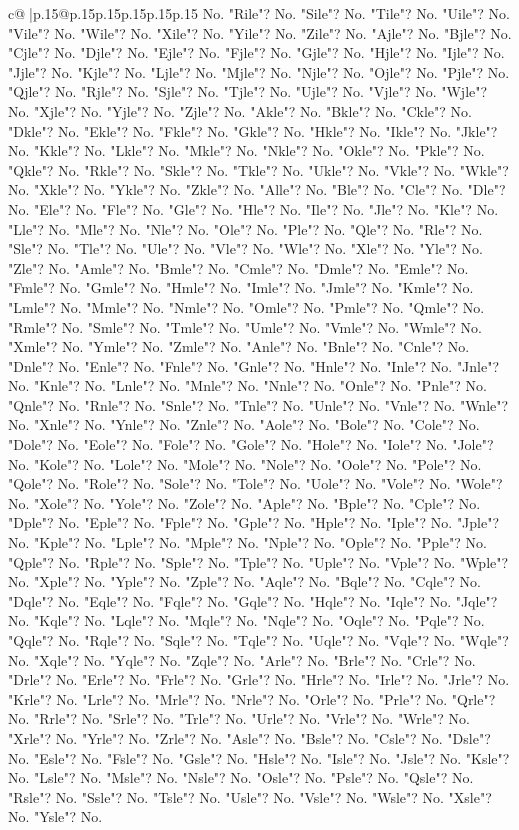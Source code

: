 \documentclass{article}
\begin{document}
{\begin{supertabular}{c@{$\;$}|p{.15\linewidth}@{}p{.15\linewidth}p{.15\linewidth}p{.15\linewidth}p{.15\linewidth}p{.15\linewidth}}
{{{No. "Rile"? No. "Sile"? No. "Tile"? No. "Uile"? No. "Vile"? No. "Wile"? No. "Xile"? No. "Yile"? No. "Zile"? No. "Ajle"? No. "Bjle"? No. "Cjle"? No. "Djle"? No. "Ejle"? No. "Fjle"? No. "Gjle"? No. "Hjle"? No. "Ijle"? No. "Jjle"? No. "Kjle"? No. "Ljle"? No. "Mjle"? No. "Njle"? No. "Ojle"? No. "Pjle"? No. "Qjle"? No. "Rjle"? No. "Sjle"? No. "Tjle"? No. "Ujle"? No. "Vjle"? No. "Wjle"? No. "Xjle"? No. "Yjle"? No. "Zjle"? No. "Akle"? No. "Bkle"? No. "Ckle"? No. "Dkle"? No. "Ekle"? No. "Fkle"? No. "Gkle"? No. "Hkle"? No. "Ikle"? No. "Jkle"? No. "Kkle"? No. "Lkle"? No. "Mkle"? No. "Nkle"? No. "Okle"? No. "Pkle"? No. "Qkle"? No. "Rkle"? No. "Skle"? No. "Tkle"? No. "Ukle"? No. "Vkle"? No. "Wkle"? No. "Xkle"? No. "Ykle"? No. "Zkle"? No. "Alle"? No. "Ble"? No. "Cle"? No. "Dle"? No. "Ele"? No. "Fle"? No. "Gle"? No. "Hle"? No. "Ile"? No. "Jle"? No. "Kle"? No. "Lle"? No. "Mle"? No. "Nle"? No. "Ole"? No. "Ple"? No. "Qle"? No. "Rle"? No. "Sle"? No. "Tle"? No. "Ule"? No. "Vle"? No. "Wle"? No. "Xle"? No. "Yle"? No. "Zle"? No. "Amle"? No. "Bmle"? No. "Cmle"? No. "Dmle"? No. "Emle"? No. "Fmle"? No. "Gmle"? No. "Hmle"? No. "Imle"? No. "Jmle"? No. "Kmle"? No. "Lmle"? No. "Mmle"? No. "Nmle"? No. "Omle"? No. "Pmle"? No. "Qmle"? No. "Rmle"? No. "Smle"? No. "Tmle"? No. "Umle"? No. "Vmle"? No. "Wmle"? No. "Xmle"? No. "Ymle"? No. "Zmle"? No. "Anle"? No. "Bnle"? No. "Cnle"? No. "Dnle"? No. "Enle"? No. "Fnle"? No. "Gnle"? No. "Hnle"? No. "Inle"? No. "Jnle"? No. "Knle"? No. "Lnle"? No. "Mnle"? No. "Nnle"? No. "Onle"? No. "Pnle"? No. "Qnle"? No. "Rnle"? No. "Snle"? No. "Tnle"? No. "Unle"? No. "Vnle"? No. "Wnle"? No. "Xnle"? No. "Ynle"? No. "Znle"? No. "Aole"? No. "Bole"? No. "Cole"? No. "Dole"? No. "Eole"? No. "Fole"? No. "Gole"? No. "Hole"? No. "Iole"? No. "Jole"? No. "Kole"? No. "Lole"? No. "Mole"? No. "Nole"? No. "Oole"? No. "Pole"? No. "Qole"? No. "Role"? No. "Sole"? No. "Tole"? No. "Uole"? No. "Vole"? No. "Wole"? No. "Xole"? No. "Yole"? No. "Zole"? No. "Aple"? No. "Bple"? No. "Cple"? No. "Dple"? No. "Eple"? No. "Fple"? No. "Gple"? No. "Hple"? No. "Iple"? No. "Jple"? No. "Kple"? No. "Lple"? No. "Mple"? No. "Nple"? No. "Ople"? No. "Pple"? No. "Qple"? No. "Rple"? No. "Sple"? No. "Tple"? No. "Uple"? No. "Vple"? No. "Wple"? No. "Xple"? No. "Yple"? No. "Zple"? No. "Aqle"? No. "Bqle"? No. "Cqle"? No. "Dqle"? No. "Eqle"? No. "Fqle"? No. "Gqle"? No. "Hqle"? No. "Iqle"? No. "Jqle"? No. "Kqle"? No. "Lqle"? No. "Mqle"? No. "Nqle"? No. "Oqle"? No. "Pqle"? No. "Qqle"? No. "Rqle"? No. "Sqle"? No. "Tqle"? No. "Uqle"? No. "Vqle"? No. "Wqle"? No. "Xqle"? No. "Yqle"? No. "Zqle"? No. "Arle"? No. "Brle"? No. "Crle"? No. "Drle"? No. "Erle"? No. "Frle"? No. "Grle"? No. "Hrle"? No. "Irle"? No. "Jrle"? No. "Krle"? No. "Lrle"? No. "Mrle"? No. "Nrle"? No. "Orle"? No. "Prle"? No. "Qrle"? No. "Rrle"? No. "Srle"? No. "Trle"? No. "Urle"? No. "Vrle"? No. "Wrle"? No. "Xrle"? No. "Yrle"? No. "Zrle"? No. "Asle"? No. "Bsle"? No. "Csle"? No. "Dsle"? No. "Esle"? No. "Fsle"? No. "Gsle"? No. "Hsle"? No. "Isle"? No. "Jsle"? No. "Ksle"? No. "Lsle"? No. "Msle"? No. "Nsle"? No. "Osle"? No. "Psle"? No. "Qsle"? No. "Rsle"? No. "Ssle"? No. "Tsle"? No. "Usle"? No. "Vsle"? No. "Wsle"? No. "Xsle"? No. "Ysle"? No. }}}
\end{supertabular}}
\end{document}
